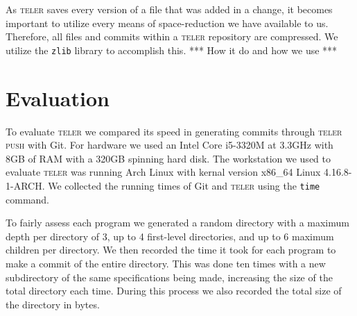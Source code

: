 \documentclass[12pt, letterpaper]{article}
\begin{document}
As \textsc{teler} saves every version of a file that was added in a change, it
becomes important to utilize every means of space-reduction we have available to
us. Therefore, all files and commits within a \textsc{teler} repository are
compressed. We utilize the \texttt{zlib} library to accomplish this. *** How it
do and how we use ***



\section{Evaluation}
\label{sec:evaluation}
To evaluate \textsc{teler} we compared its speed in generating commits
through \textsc{teler push} with Git. For hardware we used an Intel
Core i5-3320M at 3.3GHz with 8GB of RAM with a 320GB spinning hard
disk. The workstation we used to evaluate \textsc{teler} was running
Arch Linux with kernal version x86_64 Linux 4.16.8-1-ARCH. We
collected the running times of Git and \textsc{teler} using the
\texttt{time} command.

To fairly assess each program we generated a random directory with a
maximum depth per directory of 3, up to 4 first-level directories, and
up to 6 maximum children per directory. We then recorded the time it
took for each program to make a commit of the entire directory. This
was done ten times with a new subdirectory of the same specifications
being made, increasing the size of the total directory each time.
During this process we also recorded the total size of the directory
in bytes.
\end{document}
